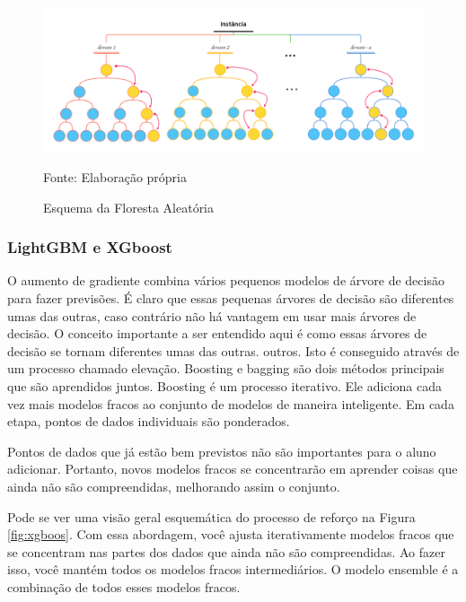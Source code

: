 \begin{figure}[H]
	\centering
	\caption{Esquema da Floresta Aleatória}
	\label{fig:rf}
	\includegraphics[width=1\linewidth]{Modelos/Figuras/RF}
	
	Fonte: Elaboração própria
\end{figure}


\subsubsection{LightGBM e XGboost}\label{subsubsec:lgbxgb}

O aumento de gradiente combina vários pequenos modelos de árvore de decisão para fazer previsões. É claro que essas pequenas árvores de decisão são diferentes umas das outras, caso contrário não há vantagem em usar mais árvores de decisão. O conceito importante a ser entendido aqui é como essas árvores de decisão se tornam diferentes umas das outras. outros. Isto é conseguido através de um processo chamado elevação. Boosting e bagging são dois métodos principais que são aprendidos juntos.  Boosting é um processo iterativo. Ele adiciona cada vez mais modelos fracos ao conjunto de modelos de maneira inteligente. Em cada etapa, pontos de dados individuais são ponderados.  

Pontos de dados que já estão bem previstos não são importantes para o aluno adicionar. Portanto, novos modelos fracos se concentrarão em aprender coisas que ainda não são compreendidas, melhorando assim o conjunto.

Pode se ver uma visão geral esquemática do processo de reforço na Figura \ref{fig:xgboos}. Com essa abordagem, você ajusta iterativamente modelos fracos que se concentram nas partes dos dados que ainda
não são compreendidas. Ao fazer isso, você mantém todos os modelos fracos intermediários. O modelo ensemble é a combinação de todos esses modelos fracos.


